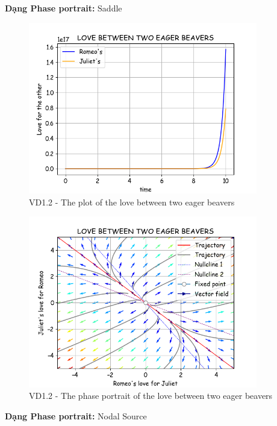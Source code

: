\textbf{Dạng Phase portrait: } Saddle
\pagebreak
\begin{figure}[!htbp]
    \centering
    \includegraphics[width=100mm]{image/bt2/plot1.2.png}
    \caption{VD1.2 - The plot of the love between two eager beavers}
\end{figure}
\begin{figure}[!htbp]
    \centering
    \includegraphics[width=100mm]{image/bt2/pp1.2.png}
    \caption{VD1.2 - The phase portrait of the love between two eager beavers}
\end{figure}

\textbf{Dạng Phase portrait: } Nodal Source
\pagebreak

